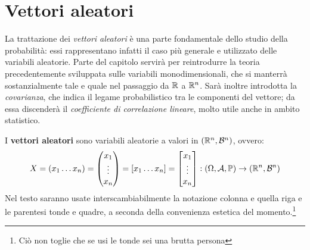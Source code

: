 
\section{Vettori aleatori}
La trattazione dei \emph{vettori aleatori} è una parte fondamentale dello studio della probabilità: essi rappresentano infatti il caso più generale e utilizzato delle variabili aleatorie.
Parte del capitolo servirà per reintrodurre la teoria precedentemente sviluppata sulle variabili monodimensionali, che si manterrà sostanzialmente tale e quale nel passaggio da $\mathbb R$ a $\mathbb R^n$.
Sarà inoltre introdotta la \emph{covarianza}, che indica il legame probabilistico tra le componenti del vettore; da essa discenderà il \emph{coefficiente di correlazione lineare}, molto utile anche in ambito statistico.

I \textbf{vettori aleatori} sono variabili aleatorie a valori in $(\mathbb R^n, \mathcal B^n)$, ovvero:
$$X = (x_1 \dots x_n) = \begin{pmatrix} x_1 \\ \vdots \\ x_n \end{pmatrix} = [x_1 \dots x_n] = \begin{bmatrix} x_1 \\ \vdots \\ x_n \end{bmatrix} : \DoCo$$
Nel testo saranno usate interscambiabilmente la notazione colonna e quella riga e le parentesi tonde e quadre, a seconda della convenienza estetica del momento.\footnote{Ciò non toglie che se usi le tonde sei una brutta persona}

